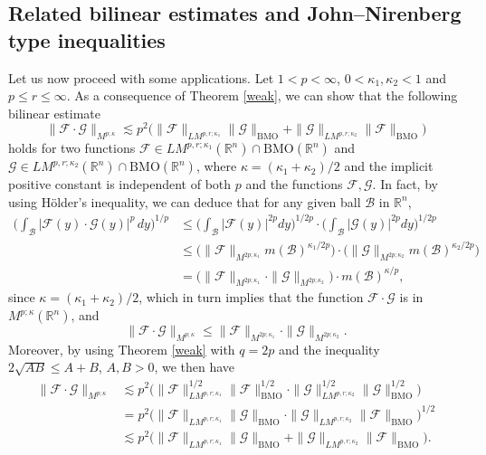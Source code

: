 \documentclass{birkjour}
\theoremstyle{definition}
\theoremstyle{remark}
\numberwithin{equation}{section}
\begin{document}
\subsection{Related bilinear estimates and John--Nirenberg type inequalities}
Let us now proceed with some applications. Let $1<p<\infty$, $0<\kappa_1,\kappa_2<1$ and $p\leq r\leq\infty$. As a consequence of Theorem \ref{weak}, we can show that the following bilinear estimate
\begin{equation}\label{bilinear21}
\|\mathcal{F}\cdot \mathcal{G}\|_{M^{p;\kappa}}\lesssim p^2
\Big(\|\mathcal{F}\|_{LM^{p,r;\kappa_1}}\|\mathcal{G}\|_{\mathrm{BMO}}
+\|\mathcal{G}\|_{LM^{p,r;\kappa_2}}\|\mathcal{F}\|_{\mathrm{BMO}}\Big)
\end{equation}
holds for two functions $\mathcal{F}\in LM^{p,r;\kappa_1}(\mathbb R^n)\cap\mathrm{BMO}(\mathbb R^n)$ and $\mathcal{G}\in LM^{p,r;\kappa_2}(\mathbb R^n)\cap\mathrm{BMO}(\mathbb R^n)$, where $\kappa={(\kappa_1+\kappa_2)}/2$ and the implicit positive constant is independent of both $p$ and the functions $\mathcal{F},\mathcal{G}$. In fact, by using H\"older's inequality, we can deduce that for any given ball $\mathcal{B}$ in $\mathbb R^n$,
\begin{equation*}
\begin{split}
\bigg(\int_{\mathcal{B}}|\mathcal{F}(y)\cdot \mathcal{G}(y)|^p\,dy\bigg)^{1/p}
&\leq\bigg(\int_{\mathcal{B}}|\mathcal{F}(y)|^{2p}dy\bigg)^{1/{2p}}
\cdot\bigg(\int_{\mathcal{B}}|\mathcal{G}(y)|^{2p}dy\bigg)^{1/{2p}}\\
&\leq\Big(\|\mathcal{F}\|_{M^{2p;\kappa_1}}m(\mathcal{B})^{{\kappa_1}/{2p}}\Big)
\cdot\Big(\|\mathcal{G}\|_{M^{2p;\kappa_2}}m(\mathcal{B})^{{\kappa_2}/{2p}}\Big)\\
&=\Big(\|\mathcal{F}\|_{M^{2p;\kappa_1}}\cdot\|\mathcal{G}\|_{M^{2p;\kappa_2}}\Big)\cdot m(\mathcal{B})^{\kappa/p},
\end{split}
\end{equation*}
since $\kappa={(\kappa_1+\kappa_2)}/2$, which in turn implies that the function $\mathcal{F}\cdot \mathcal{G}$ is in $M^{p;\kappa}(\mathbb R^n)$, and
\begin{equation}\label{holdermorrey}
\|\mathcal{F}\cdot \mathcal{G}\|_{M^{p;\kappa}}
\leq\|\mathcal{F}\|_{M^{2p;\kappa_1}}\cdot\|\mathcal{G}\|_{M^{2p;\kappa_2}}.
\end{equation}
Moreover, by using Theorem \ref{weak} with $q=2p$ and the inequality $2\sqrt{AB}\leq A+B$, $A,B>0$, we then have
\begin{equation*}
\begin{split}
\|\mathcal{F}\cdot \mathcal{G}\|_{M^{p;\kappa}}
&\lesssim p^2
\Big(\|\mathcal{F}\|_{LM^{p,r;\kappa_1}}^{1/2}\|\mathcal{F}\|_{\mathrm{BMO}}^{1/2}
\cdot\|\mathcal{G}\|_{LM^{p,r;\kappa_2}}^{1/2}\|\mathcal{G}\|_{\mathrm{BMO}}^{1/2}\Big)\\
&=p^2
\Big(\|\mathcal{F}\|_{LM^{p,r;\kappa_1}}\|\mathcal{G}\|_{\mathrm{BMO}}
\cdot\|\mathcal{G}\|_{LM^{p,r;\kappa_2}}\|\mathcal{F}\|_{\mathrm{BMO}}\Big)^{1/2}\\
&\lesssim p^2
\Big(\|\mathcal{F}\|_{LM^{p,r;\kappa_1}}\|\mathcal{G}\|_{\mathrm{BMO}}
+\|\mathcal{G}\|_{LM^{p,r;\kappa_2}}\|\mathcal{F}\|_{\mathrm{BMO}}\Big).
\end{split}
\end{equation*}
\end{document}
